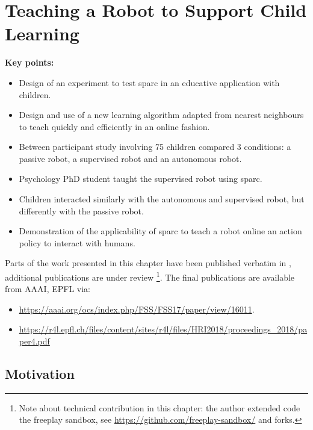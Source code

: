 \chapter{Teaching a Robot to Support Child Learning}\label{chap:tutoring}
\glsresetall
\graphicspath{{images/tutoring/}}

\begin{framed}
	\textbf{Key points:}
	
	\begin{itemize}
		\item Design of an experiment to test \acrshort{sparc} in an educative application with children.
		\item Design and use of a new learning algorithm adapted from nearest neighbours to teach quickly and efficiently in an online fashion.
		\item Between participant study involving 75 children compared 3 conditions: a passive robot, a supervised robot and an autonomous robot.
		\item Psychology PhD student taught the supervised robot using \acrshort{sparc}.
		\item Children interacted similarly with the autonomous and supervised robot, but differently with the passive robot.
		\item Demonstration of the applicability of \acrshort{sparc} to teach a robot online an action policy to interact with humans.
	\end{itemize}
\end{framed}

Parts of the work presented in this chapter have been published verbatim in \cite{senft2017toward}, additional publications are under review \footnote{Note about technical contribution in this chapter: the author extended code the freeplay sandbox, see \url{https://github.com/freeplay-sandbox/} and forks.}. The final publications are available from AAAI, EPFL via:
\begin{itemize}
	\item \url{https://aaai.org/ocs/index.php/FSS/FSS17/paper/view/16011}.
	\item \url{https://r4l.epfl.ch/files/content/sites/r4l/files/HRI2018/proceedings_2018/paper4.pdf}
\end{itemize} 

\newpage

\section{Motivation}

